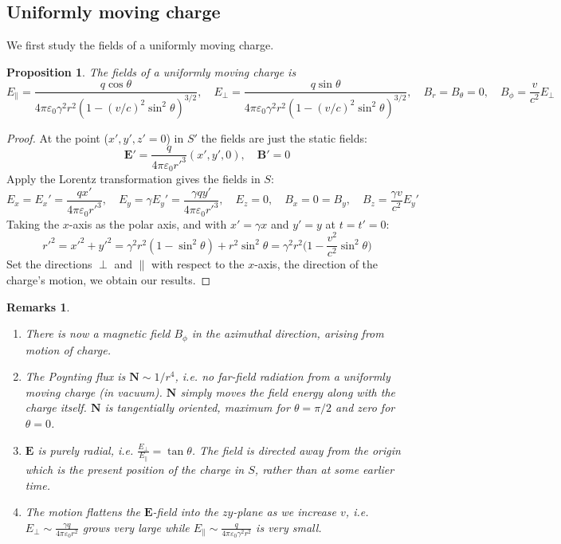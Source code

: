 \documentclass[a4paper]{article}
\newtheorem{remarks}{Remarks}[section]
\theoremstyle{new}
\newtheorem{prop}{Proposition}[section]
\begin{document}
\subsection{Uniformly moving charge}
We first study the fields of a uniformly moving charge.
\begin{prop}
The fields of a uniformly moving charge is
$$E_\parallel=\frac{q\cos\theta}{4\pi\varepsilon_0\gamma^2r^2(1-(v/c)^2\sin^2\theta)^{3/2}},\quad E_\perp=\frac{q\sin\theta}{4\pi\varepsilon_0\gamma^2r^2(1-(v/c)^2\sin^2\theta)^{3/2}},\quad B_r=B_\theta=0,\quad B_\phi=\frac{v}{c^2}E_\perp$$
\end{prop}
\begin{proof}
At the point ($x',y',z'=0$) in $S'$ the fields are just the static fields:
$$\mathbf{E'}=\frac{q}{4\pi\varepsilon_0 r'^3}(x',y',0),\quad\mathbf{B'}=0$$
Apply the Lorentz transformation gives the fields in $S$:
$$E_x=E_x'=\frac{qx'}{4\pi\varepsilon_0r'^3},\quad E_y=\gamma E_y'=\frac{\gamma qy'}{4\pi\varepsilon_0r'^3},\quad E_z=0,\quad B_x=0=B_y,\quad B_z=\frac{\gamma v}{c^2}E_y'$$
Taking the $x$-axis as the polar axis, and with $x'=\gamma x$ and $y'=y$ at $t=t'=0$:
$$r'^2=x'^2+y'^2=\gamma^2r^2(1-\sin^2\theta)+r^2\sin^2\theta=\gamma^2r^2\bigg(1-\frac{v^2}{c^2}\sin^2\theta\bigg)$$
Set the directions $\perp$ and $\parallel$ with respect to the $x$-axis, the direction of the charge's motion, we obtain our results.
\end{proof}
\begin{remarks}\leavevmode
\begin{enumerate}
\item There is now a magnetic field $B_\phi$ in the azimuthal direction, arising from motion of charge. 
\item The Poynting flux is $\mathbf{N}\sim1/r^4$, i.e. no far-field radiation from a uniformly moving charge (in vacuum). $\mathbf{N}$ simply moves the field energy along with the charge itself. $\mathbf{N}$ is tangentially oriented, maximum for $\theta=\pi/2$ and zero for $\theta=0$.
\item $\mathbf{E}$ is purely radial, i.e. $\frac{E_\perp}{E_\parallel}=\tan\theta$. The field is directed away from the origin which is the present position of the charge in $S$, rather than at some earlier time.
\item The motion flattens the $\mathbf{E}$-field into the $zy$-plane as we increase $v$, i.e. $E_\perp\sim\frac{\gamma q}{4\pi\varepsilon_0r^2}$ grows very large while $E_\parallel\sim\frac{q}{4\pi\varepsilon_0\gamma^2r^2}$ is very small.
\end{enumerate}
\end{remarks}
\end{document}
